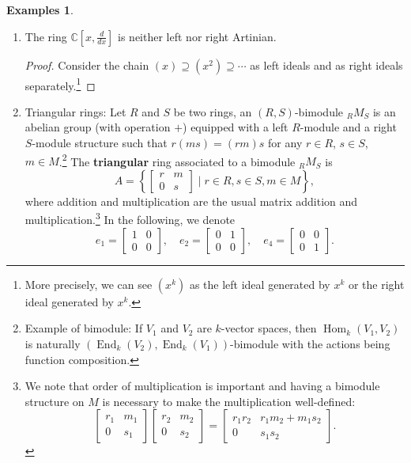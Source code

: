 \documentclass{tufte-handout} %
\theoremstyle{definition}
\newtheorem{exmps}[thm]{Examples}
\theoremstyle{remark}
\renewcommand{\C}{\mathbb{C}}
\DeclareMathOperator{\End}{End}
\DeclareMathOperator{\Hom}{Hom}
\begin{document}
\begin{exmps}
\begin{enumerate}
\begin{proof}
		\end{proof}
		\item The ring $\C[x,\frac{d}{dx}] $ is neither left nor right Artinian.
		\begin{proof}
			Consider the chain $(x) \supseteq (x^2) \supseteq \cdots$ as left ideals and as right ideals separately.\footnote{More precisely, we can see $(x^k)$ as the left ideal generated by $x^k$ or the right ideal generated by $x^k$.} %
		\end{proof}
		\item Triangular rings: Let $R$ and $S$ be two rings, an $(R,S)$-bimodule ${}_RM{}_S$ is an abelian group (with operation $+$) equipped with a left $R$-module and a right $S$-module structure such that $r(ms) = (rm)s$ for any $r \in R$, $s \in S$, $m \in M$.\footnote{Example of bimodule: If $V_1$ and $V_2$ are $k$-vector spaces, then $\Hom_k(V_1, V_2)$ is naturally $(\End_k(V_2), \End_k(V_1))$-bimodule with the actions being function composition.} The \textbf{triangular} ring associated to a bimodule ${}_RM_S$ is \[A = \left\{\begin{bmatrix}
		r&m\\0&s\end{bmatrix} \mid r \in R, s \in S, m\in M\right\},\] where addition and multiplication are the usual matrix addition and multiplication.\footnote{We note that order of multiplication is important and having a bimodule structure on $M$ is necessary to make the multiplication well-defined:
		\[\begin{bmatrix}
		r_1&m_1\\0&s_1\end{bmatrix}\begin{bmatrix}
		r_2&m_2\\0&s_2\end{bmatrix} = \begin{bmatrix}
		r_1r_2&r_1m_2+m_1s_2\\0&s_1s_2\end{bmatrix}.\]}
		In the following, we denote
		\[e_1 = \begin{bmatrix}1&0\\0&0\end{bmatrix}, \quad e_2 = \begin{bmatrix}0&1\\0&0\end{bmatrix}, \quad e_4 = \begin{bmatrix}0&0\\0&1\end{bmatrix}.\]

\end{enumerate}
\end{exmps}
\end{document}
